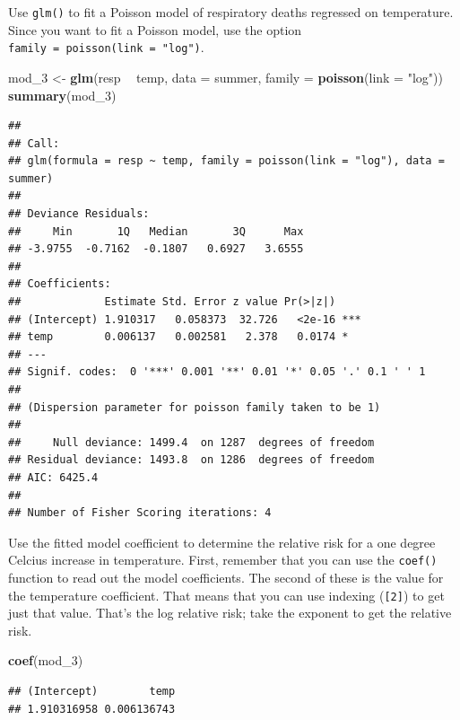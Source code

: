 \documentclass[]{book}
\makeatletter
\newenvironment{Shaded}{\begin{snugshade}}{\end{snugshade}}
\newcommand{\KeywordTok}[1]{\textcolor[rgb]{0.13,0.29,0.53}{\textbf{#1}}}
\newcommand{\DataTypeTok}[1]{\textcolor[rgb]{0.13,0.29,0.53}{#1}}
\newcommand{\DecValTok}[1]{\textcolor[rgb]{0.00,0.00,0.81}{#1}}
\newcommand{\StringTok}[1]{\textcolor[rgb]{0.31,0.60,0.02}{#1}}
\newcommand{\OperatorTok}[1]{\textcolor[rgb]{0.81,0.36,0.00}{\textbf{#1}}}
\newcommand{\NormalTok}[1]{#1}
\newenvironment{kframe}{%
\medskip{}
\setlength{\fboxsep}{.8em}
 \def\at@end@of@kframe{}%
 \ifinner\ifhmode%
  \def\at@end@of@kframe{\end{minipage}}%
  \begin{minipage}{\columnwidth}%
 \fi\fi%
 \def\FrameCommand##1{\hskip\@totalleftmargin \hskip-\fboxsep
 \colorbox{shadecolor}{##1}\hskip-\fboxsep
     \hskip-\linewidth \hskip-\@totalleftmargin \hskip\columnwidth}%
 \MakeFramed {\advance\hsize-\width
   \@totalleftmargin\z@ \linewidth\hsize
   \@setminipage}}%
 {\par\unskip\endMakeFramed%
 \at@end@of@kframe}
\renewenvironment{Shaded}{\begin{kframe}}{\end{kframe}}
\theoremstyle{definition}
\theoremstyle{definition}
\theoremstyle{definition}
\theoremstyle{remark}
\makeatother
\begin{document}
Use \texttt{glm()} to fit a Poisson model of respiratory deaths
regressed on temperature. Since you want to fit a Poisson model, use the
option \texttt{family\ =\ poisson(link\ =\ "log")}.

\begin{Shaded}
\begin{Highlighting}[]
\NormalTok{mod_}\DecValTok{3}\NormalTok{ <-}\StringTok{ }\KeywordTok{glm}\NormalTok{(resp }\OperatorTok{~}\StringTok{ }\NormalTok{temp, }\DataTypeTok{data =}\NormalTok{ summer,}
             \DataTypeTok{family =} \KeywordTok{poisson}\NormalTok{(}\DataTypeTok{link =} \StringTok{"log"}\NormalTok{))}
\KeywordTok{summary}\NormalTok{(mod_}\DecValTok{3}\NormalTok{)}
\end{Highlighting}
\end{Shaded}

\begin{verbatim}
## 
## Call:
## glm(formula = resp ~ temp, family = poisson(link = "log"), data = summer)
## 
## Deviance Residuals: 
##     Min       1Q   Median       3Q      Max  
## -3.9755  -0.7162  -0.1807   0.6927   3.6555  
## 
## Coefficients:
##             Estimate Std. Error z value Pr(>|z|)    
## (Intercept) 1.910317   0.058373  32.726   <2e-16 ***
## temp        0.006137   0.002581   2.378   0.0174 *  
## ---
## Signif. codes:  0 '***' 0.001 '**' 0.01 '*' 0.05 '.' 0.1 ' ' 1
## 
## (Dispersion parameter for poisson family taken to be 1)
## 
##     Null deviance: 1499.4  on 1287  degrees of freedom
## Residual deviance: 1493.8  on 1286  degrees of freedom
## AIC: 6425.4
## 
## Number of Fisher Scoring iterations: 4
\end{verbatim}

Use the fitted model coefficient to determine the relative risk for a
one degree Celcius increase in temperature. First, remember that you can
use the \texttt{coef()} function to read out the model coefficients. The
second of these is the value for the temperature coefficient. That means
that you can use indexing (\texttt{{[}2{]}}) to get just that value.
That's the log relative risk; take the exponent to get the relative
risk.

\begin{Shaded}
\begin{Highlighting}[]
\KeywordTok{coef}\NormalTok{(mod_}\DecValTok{3}\NormalTok{)}
\end{Highlighting}
\end{Shaded}

\begin{verbatim}
## (Intercept)        temp 
## 1.910316958 0.006136743
\end{verbatim}
\end{document}
